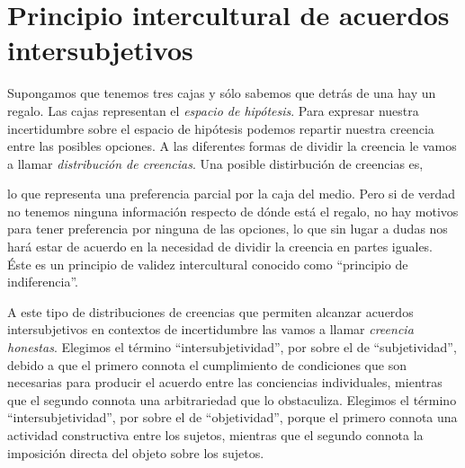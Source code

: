 \documentclass[a4paper,10pt]{book}
\theoremstyle{definition}
\begin{document}
\section{Principio intercultural de acuerdos intersubjetivos}

Supongamos que tenemos tres cajas y sólo sabemos que detrás de una hay un regalo.
Las cajas representan el \emph{espacio de hipótesis}.
Para expresar nuestra incertidumbre sobre el espacio de hipótesis podemos repartir nuestra creencia entre las posibles opciones.
A las diferentes formas de dividir la creencia le vamos a llamar \emph{distribución de creencias}.
Una posible distirbución de creencias es,
%
\begin{figure}[H]
\centering
{} 
\caption{}
\end{figure}
%
lo que representa una preferencia parcial por la caja del medio.
Pero si de verdad no tenemos ninguna información respecto de dónde está el regalo, no hay motivos para tener preferencia por ninguna de las opciones, lo que sin lugar a dudas nos hará estar de acuerdo en la necesidad de dividir la creencia en partes iguales.
Éste es un principio de validez intercultural conocido como ``principio de indiferencia''.
%
\begin{figure}[H]
\centering
{} 
\caption{}
\label{fig:principio_de_indiferencia}
\end{figure}
%
A este tipo de distribuciones de creencias que permiten alcanzar acuerdos intersubjetivos en contextos de incertidumbre las vamos a llamar \emph{creencia honestas}.
Elegimos el término ``intersubjetividad'', por sobre el de ``subjetividad'', debido a que el primero connota el cumplimiento de condiciones que son necesarias para producir el acuerdo entre las conciencias individuales, mientras que el segundo connota una arbitrariedad que lo obstaculiza.
Elegimos el término ``intersubjetividad'', por sobre el de ``objetividad'', porque el primero connota una actividad constructiva entre los sujetos, mientras que el segundo connota la imposición directa del objeto sobre los sujetos.
\end{document}
